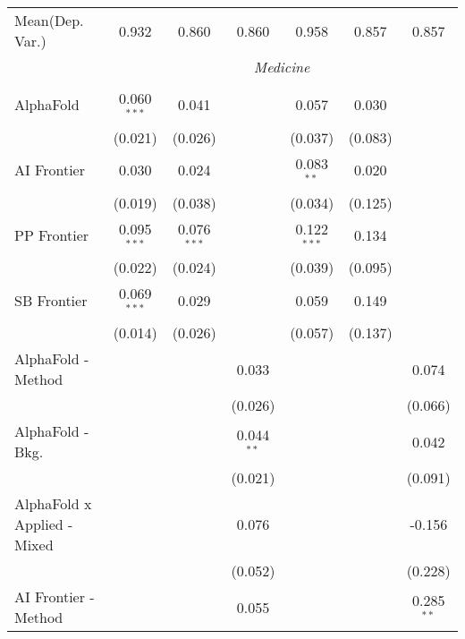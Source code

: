 \begin{tabular}{lcccccc}
Mean(Dep. Var.) & 0.932 & 0.860 & 0.860 & 0.958 & 0.857 & 0.857 \\
 & \multicolumn{6}{c}{\textit{Medicine}} \\ \\
   AlphaFold                     & 0.060$^{***}$ & 0.041         &               & 0.057         & 0.030   &   \\   
                                 & (0.021)       & (0.026)       &               & (0.037)       & (0.083) &   \\   
   AI Frontier                   & 0.030         & 0.024         &               & 0.083$^{**}$  & 0.020   &   \\   
                                 & (0.019)       & (0.038)       &               & (0.034)       & (0.125) &   \\   
   PP Frontier                   & 0.095$^{***}$ & 0.076$^{***}$ &               & 0.122$^{***}$ & 0.134   &   \\   
                                 & (0.022)       & (0.024)       &               & (0.039)       & (0.095) &   \\   
   SB Frontier                   & 0.069$^{***}$ & 0.029         &               & 0.059         & 0.149   &   \\   
                                 & (0.014)       & (0.026)       &               & (0.057)       & (0.137) &   \\   
   AlphaFold - Method            &               &               & 0.033         &               &         & 0.074\\   
                                 &               &               & (0.026)       &               &         & (0.066)\\   
   AlphaFold - Bkg.              &               &               & 0.044$^{**}$  &               &         & 0.042\\   
                                 &               &               & (0.021)       &               &         & (0.091)\\   
   AlphaFold x Applied - Mixed   &               &               & 0.076         &               &         & -0.156\\   
                                 &               &               & (0.052)       &               &         & (0.228)\\   
   AI Frontier - Method          &               &               & 0.055         &               &         & 0.285$^{**}$\\   

\end{tabular}
